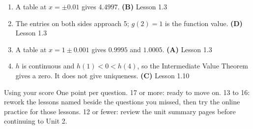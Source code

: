 \documentclass[11pt]{article}
\begin{document}
\begin{solbox}
\begin{enumerate}[leftmargin=*,itemsep=3pt]
  \item A table at $x=\pm0.01$ gives $4.4997$. \textbf{(B)} \hfill{\footnotesize Lesson 1.3}
  \item The entries on both sides approach 5; $g(2)=1$ is the function value. \textbf{(D)} \hfill{\footnotesize Lesson 1.3}
  \item A table at $x=1\pm0.001$ gives $0.9995$ and $1.0005$. \textbf{(A)} \hfill{\footnotesize Lesson 1.3}
  \item $h$ is continuous and $h(1)<0<h(4)$, so the Intermediate Value Theorem gives a zero. It does not give uniqueness. \textbf{(C)} \hfill{\footnotesize Lesson 1.10}
\end{enumerate}
\end{solbox}

\begin{scorebox}{Using your score}
One point per question. 17 or more: ready to move on. 13 to 16: rework the lessons named beside the questions you missed, then try the online practice for those lessons. 12 or fewer: review the unit summary pages before continuing to Unit 2.
\end{scorebox}
\end{document}
